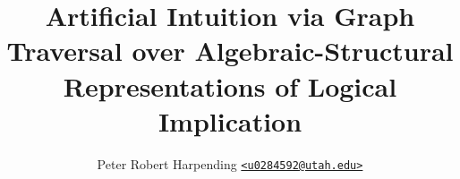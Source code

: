 \documentclass[12pt,letterpaper,onepage]{memoir}
\makeatletter
\newcommand{\code}[1]{\texttt{#1}}
\newcommand{\email}[1]{\href{mailto:#1}{\code{<#1>}}}
\newcommand{\person}[2]{#1 \email{#2}}
\newcommand{\pharpend}{\person{Peter Robert Harpending}{u0284592@utah.edu}}
\makeatother
\begin{document}
\title{Artificial Intuition via Graph Traversal over Algebraic-Structural
  Representations of Logical Implication}
\author{\pharpend}
\date{\Today}
\maketitle

\printbibliography
\end{document}
